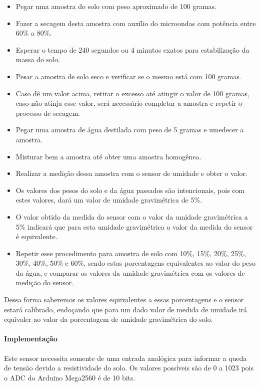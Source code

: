		\begin{itemize}
			\item Pegar uma amostra do solo com peso aproximado de 100 gramas.
			\item Fazer a secagem desta amostra com auxílio do microondas com potência entre 60\% a 80\%.
			\item Esperar o tempo de 240 segundos ou 4 minutos exatos para estabilização da massa do solo.
			\item Pesar a amostra de solo seco e verificar se o mesmo está com 100 gramas.
			\item Caso dê um valor acima, retirar o excesso até atingir o valor de 100 gramas,
				caso não atinja esse valor, será necessário completar a amostra e repetir o processo de secagem.
			\item Pegar uma amostra de água destilada com peso de 5 gramas e umedecer a amostra.
			\item Misturar bem a amostra até obter uma amostra homogênea.
			\item Realizar a medição dessa amostra com o sensor de umidade e obter o valor.
			\item Os valores dos pesos do solo e da água passados são intencionais, pois com
				estes valores, dará um valor de umidade gravimétrica de 5\%.
			\item O valor obtido da medida do sensor com o valor da umidade gravimétrica a
				5\% indicará que para esta umidade gravimétrica o valor da medida do sensor é equivalente.
			\item Repetir esse procedimento para amostra de solo com 10\%, 15\%, 20\%, 25\%,
				30\%, 40\%, 50\% e 60\%, sendo estas porcentagens equivalentes ao valor do peso
				da água, e comparar os valores da umidade gravimétrica com os valores de medição do sensor.
		\end{itemize}

		Dessa forma saberemos os valores equivalentes a essas porcentagens e o sensor
		estará calibrado, endoçando que para um dado valor de medida de umidade irá
		equivaler ao valor da porcentagem de umidade gravimétrica do solo.

		\paragraph{Implementação}

			Este sensor necessita somente de uma entrada analógica para informar
			a queda de tensão devido a resistividade do solo. Os valores possíveis
			são de 0 a 1023 pois o ADC do Arduino Mega2560 é de 10 bits.

